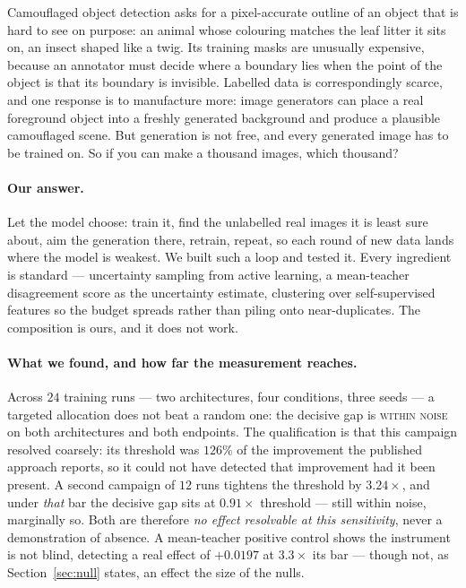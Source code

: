 \documentclass{article} %
\begin{document}
Camouflaged object detection asks for a pixel-accurate outline of an object that is hard to see on
purpose: an animal whose colouring matches the leaf litter it sits on, an insect shaped like a twig.
Its training masks are unusually expensive, because an annotator must decide where a boundary lies
when the point of the object is that its boundary is invisible. Labelled data is correspondingly
scarce, and one response is to manufacture more: image generators can place a real foreground object
into a freshly generated background and produce a plausible camouflaged scene. But generation
is not free, and every generated image has to be trained on. So if you can make a thousand images,
which thousand?

\paragraph{Our answer.} Let the model choose: train it, find the unlabelled real images it is least
sure about, aim the generation there, retrain, repeat, so each round of new data lands where the
model is weakest. We built such a loop and tested it. Every ingredient is standard --- uncertainty
sampling from active learning, a mean-teacher disagreement score as the uncertainty estimate,
clustering over self-supervised features so the budget spreads rather than piling onto
near-duplicates. The composition is ours, and it does not work.

\paragraph{What we found, and how far the measurement reaches.} Across $24$ training runs --- two
architectures, four conditions, three seeds --- a targeted allocation does not beat a random one:
the decisive gap is \textsc{within noise} on both architectures and both endpoints. The
qualification is that this campaign resolved coarsely: its threshold was $126\%$ of the improvement
the published approach reports, so it could not have detected that improvement had it been present.
A second campaign of $12$ runs tightens the threshold by $3.24\times$, and under \emph{that} bar the
decisive gap sits at $0.91\times$ threshold --- still within noise, marginally so. Both are therefore
\emph{no effect resolvable at this sensitivity}, never a demonstration of absence. A mean-teacher
positive control shows the instrument is not blind, detecting a real effect of $+0.0197$ at
$3.3\times$ its bar --- though not, as Section~\ref{sec:null} states, an effect the size of the
nulls.
\end{document}
